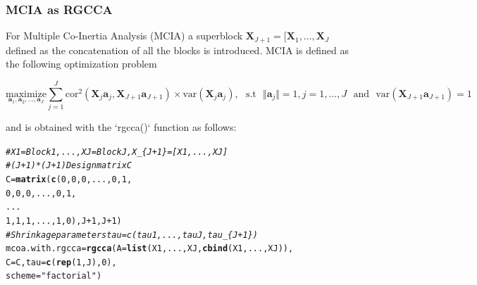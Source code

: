 \documentclass[10pt,xcolor=dvipsnames]{beamer}\usepackage[]{graphicx}\usepackage[]{color}
\makeatletter
\newcommand{\hlstr}[1]{\textcolor[rgb]{0.192,0.494,0.8}{#1}}%
\newcommand{\hlcom}[1]{\textcolor[rgb]{0.678,0.584,0.686}{\textit{#1}}}%
\newcommand{\hlkwd}[1]{\textcolor[rgb]{0.737,0.353,0.396}{\textbf{#1}}}%
\newenvironment{kframe}{%
 \def\at@end@of@kframe{}%
 \ifinner\ifhmode%
  \def\at@end@of@kframe{\end{minipage}}%
  \begin{minipage}{\columnwidth}%
 \fi\fi%
 \def\FrameCommand##1{\hskip\@totalleftmargin \hskip-\fboxsep
 \colorbox{shadecolor}{##1}\hskip-\fboxsep
     \hskip-\linewidth \hskip-\@totalleftmargin \hskip\columnwidth}%
 \MakeFramed {\advance\hsize-\width
   \@totalleftmargin\z@ \linewidth\hsize
   \@setminipage}}%
 {\par\unskip\endMakeFramed%
 \at@end@of@kframe}
\newenvironment{knitrout}{}{} %
\newcommand{\X}{\mathbf{X}}
\newcommand{\ma}[1]{\ensuremath{\mathbf{#1}}}
\makeatother
\begin{document}
\begin{frame}\frametitle{MCIA as RGCCA}

For Multiple Co-Inertia Analysis (MCIA) a superblock $\ma X_{J+1} = [\ma X_1, \dots, \ma X_J$ defined as the concatenation of all the blocks is introduced. MCIA is defined as the following optimization problem 

\begin{equation}
\underset{\ma a_1, \ma a_2, \ldots,\ma a_J} {\text{maximize}} \displaystyle \sum_{j=1}^J \text{cor}^2(\ma X_j\ma a_j, \ma X_{J+1}\ma a_{J+1})\times \text{var}(\X_j\ma a_j), \text{~~s.t~~} \Vert \ma a_j \Vert = 1, j=1, \ldots, J \text{~~and~~} \text{var}(\X_{J+1}\ma a_{J+1}) = 1
\end{equation}

and is obtained with the `rgcca()` function as follows:
\begin{knitrout}\footnotesize
{}\color{fgcolor}\begin{kframe}
\begin{alltt}
\hlcom{# X1 = Block1, ..., XJ = BlockJ, X_\{J+1\} = [X1, ..., XJ]}
\hlcom{# (J+1)*(J+1) Design matrix C}
C = \hlkwd{matrix}(\hlkwd{c}(0, 0, 0, ..., 0, 1,
             0, 0, 0, ..., 0, 1,
                  ...
             1, 1, 1, ..., 1, 0), J+1, J+1)
\hlcom{# Shrinkage parameters tau = c(tau1, ...,  tauJ, tau_\{J+1\})}
mcoa.with.rgcca = \hlkwd{rgcca}(A= \hlkwd{list}(X1, ..., XJ, \hlkwd{cbind}(X1, ..., XJ)), 
                       C = C, tau = \hlkwd{c}(\hlkwd{rep}(1, J), 0),
                       scheme = \hlstr{"factorial"})
\end{alltt}
\end{kframe}
\end{knitrout}
\end{frame}
\end{document}
